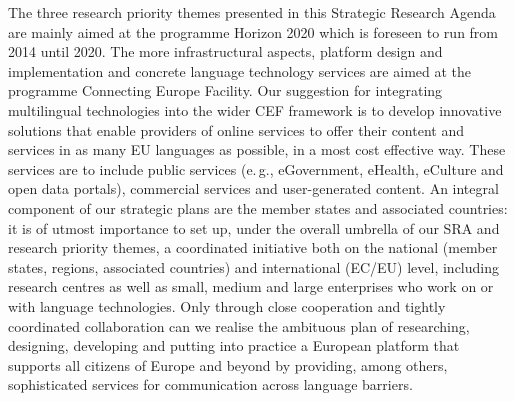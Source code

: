 \documentclass[10pt, plain]{../../metanetpaper}
\begin{document}
\begin{multicols}{2}
The three research priority themes presented in this Strategic Research Agenda are mainly aimed at the programme Horizon 2020 which is foreseen to run from 2014 until 2020. The more infrastructural aspects, platform design and implementation and concrete language technology services are aimed at the programme Connecting Europe Facility. Our suggestion for integrating multilingual technologies into the wider CEF framework is to develop innovative solutions that enable providers of online services to offer their content and services in as many EU languages as possible, in a most cost effective way. These services are to include public services (e.\,g., eGovernment, eHealth, eCulture and open data portals), commercial services and user-generated content. An integral component of our strategic plans are the member states and associated countries: it is of utmost importance to set up, under the overall umbrella of our SRA and research priority themes, a coordinated initiative both on the national (member states, regions, associated countries) and international (EC/EU) level, including research centres as well as small, medium and large enterprises who work on or with language technologies. Only through close cooperation and tightly coordinated collaboration can we realise the ambituous plan of researching, designing, developing and putting into practice a European platform that supports all citizens of Europe and beyond by providing, among others, sophisticated services for communication across language barriers.


\end{multicols}

\clearpage


\end{document}
